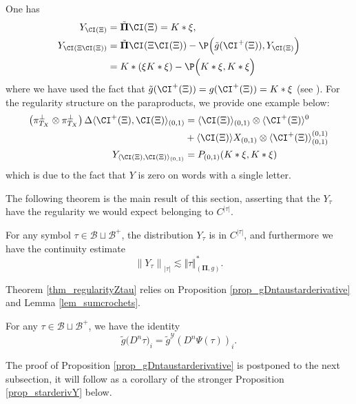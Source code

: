\documentclass[11pt]{preprint}
\newcommand{\mcB}{\mathcal{B}}
\newcommand{\mcY}{\mathcal{Y}}
\newcounter{theorem}
\def\PPi{\boldsymbol{\Pi}}
\renewcommand{\lg}{\langle}
\newcommand{\rg}{\rangle}
\newcommand{\norme}[1]{\left\lVert #1 \right\lVert}
\begin{document}
	\begin{example} 
		One has 
		\begin{equation*}
			\begin{aligned}
			Y_{\CI(\Xi)} &= \tilde{\PPi} \CI(\Xi) = K * \xi,
			\\
				Y_{\CI(\Xi \CI(\Xi))} & = \tilde{\PPi} \CI(\Xi \CI(\Xi)) - \P\Big(\tilde{g}(\CI^{+}(\Xi)), Y_{\CI(\Xi)} \Big) \\ &  =  K* (\xi K*\xi) - \P\Big(K*\xi, K*\xi \Big)
				\end{aligned}
		\end{equation*}
		where we have used the fact that $\tilde{g}(\CI^{+}(\Xi)) = g(\CI^{+}(\Xi)) =  K * \xi  $ (see \cite[Proposition 15]{BH26}). For the regularity structure on the paraproducts, we provide one example below:
		\begin{equation*}
			\begin{aligned}
		\left( \pi^{\perp}_{T_X} \otimes \pi^{\perp}_{T_X} \right)	\Delta \lg  \CI^+(\Xi),  \CI(\Xi ) \rg_{(0,1)} &=   \lg \CI(\Xi) \rg_{(0,1)} \otimes  \lg \CI^+(\Xi)\rg^0 \\ & + \lg \CI(\Xi) \rg X_{(0,1)} \otimes  \lg \CI^+(\Xi) \rg_{(0,1)}^{(0,1)}
			\\
			Y_{\lg  \CI(\Xi),  \CI(\Xi ) \rg_{(0,1)}} &= P_{(0,1)}(K*\xi , K * \xi)
			\end{aligned}
		\end{equation*}
		which is due to the fact that $Y$ is zero on words with a single letter.
	\end{example}
	The following theorem is the main result of this section, asserting that the $Y_\tau$ have the regularity we would expect belonging to $ C^{|\tau|} $.
\begin{theorem} \label{thm_regularityZtau}
		For any symbol $\tau\in \mcB \sqcup \mcB^+$, the distribution $Y_\tau$ is in $C^{|\tau|}$, and furthermore we have the continuity estimate
		\begin{equation}\label{eq_continuity_Y}
		\norme{Y_\tau}_{|\tau|} \lesssim  \Vert\tau\Vert_{ (\PPi,g)}^*.
	\end{equation}
	\end{theorem}
	Theorem \ref{thm_regularityZtau} relies on  Proposition \ref{prop_gDntaustarderivative} and Lemma \ref{lem_sumcrochets}. 
	\begin{proposition}\label{prop_gDntaustarderivative}
		For any $\tau\in \mcB \sqcup \mcB^+$, we have the identity
		\begin{equation}\label{eq_starderivativeZtau}
			\widetilde{ g}\big( D^n\tau\big)_i = \widetilde{ g}^\mcY\left(D^n\Psi(\tau)\right)_i. 
		\end{equation}
	\end{proposition}
	The proof of Proposition \ref{prop_gDntaustarderivative} is postponed to the next subsection, it will follow as a corollary of the stronger Proposition \ref{prop_starderivY} below. 
	
\end{document}
